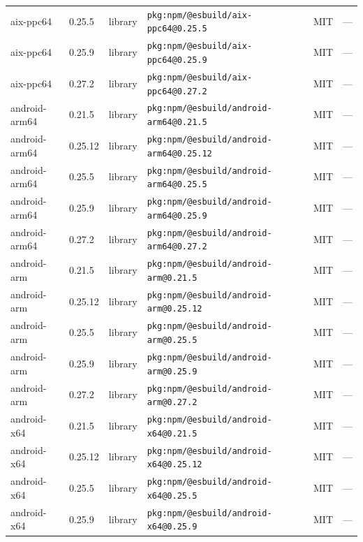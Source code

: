 \documentclass[11pt,a4paper]{article}
\begin{document}
\begin{longtable}{|p{4cm}|p{2cm}|p{1.6cm}|p{5cm}|p{1.5cm}|p{3.5cm}|}
\raggedright aix-ppc64 & 0.25.5 & library & \small\texttt{pkg:npm/@esbuild/aix-ppc64@0.25.5} & MIT & \small — \\
\raggedright aix-ppc64 & 0.25.9 & library & \small\texttt{pkg:npm/@esbuild/aix-ppc64@0.25.9} & MIT & \small — \\
\raggedright aix-ppc64 & 0.27.2 & library & \small\texttt{pkg:npm/@esbuild/aix-ppc64@0.27.2} & MIT & \small — \\
\raggedright android-arm64 & 0.21.5 & library & \small\texttt{pkg:npm/@esbuild/android-arm64@0.21.5} & MIT & \small — \\
\raggedright android-arm64 & 0.25.12 & library & \small\texttt{pkg:npm/@esbuild/android-arm64@0.25.12} & MIT & \small — \\
\raggedright android-arm64 & 0.25.5 & library & \small\texttt{pkg:npm/@esbuild/android-arm64@0.25.5} & MIT & \small — \\
\raggedright android-arm64 & 0.25.9 & library & \small\texttt{pkg:npm/@esbuild/android-arm64@0.25.9} & MIT & \small — \\
\raggedright android-arm64 & 0.27.2 & library & \small\texttt{pkg:npm/@esbuild/android-arm64@0.27.2} & MIT & \small — \\
\raggedright android-arm & 0.21.5 & library & \small\texttt{pkg:npm/@esbuild/android-arm@0.21.5} & MIT & \small — \\
\raggedright android-arm & 0.25.12 & library & \small\texttt{pkg:npm/@esbuild/android-arm@0.25.12} & MIT & \small — \\
\raggedright android-arm & 0.25.5 & library & \small\texttt{pkg:npm/@esbuild/android-arm@0.25.5} & MIT & \small — \\
\raggedright android-arm & 0.25.9 & library & \small\texttt{pkg:npm/@esbuild/android-arm@0.25.9} & MIT & \small — \\
\raggedright android-arm & 0.27.2 & library & \small\texttt{pkg:npm/@esbuild/android-arm@0.27.2} & MIT & \small — \\
\raggedright android-x64 & 0.21.5 & library & \small\texttt{pkg:npm/@esbuild/android-x64@0.21.5} & MIT & \small — \\
\raggedright android-x64 & 0.25.12 & library & \small\texttt{pkg:npm/@esbuild/android-x64@0.25.12} & MIT & \small — \\
\raggedright android-x64 & 0.25.5 & library & \small\texttt{pkg:npm/@esbuild/android-x64@0.25.5} & MIT & \small — \\
\raggedright android-x64 & 0.25.9 & library & \small\texttt{pkg:npm/@esbuild/android-x64@0.25.9} & MIT & \small — \\

\end{longtable}
\end{document}
